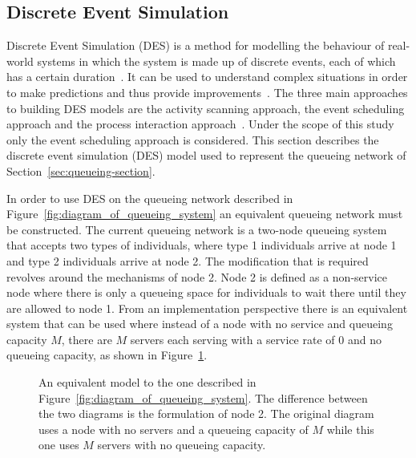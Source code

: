 \subsection{Discrete Event Simulation}\label{sec:discrete_event_simulation}

Discrete Event Simulation (DES) is a method for modelling the behaviour of
real-world systems in which the system is made up of discrete events, each of
which has a certain duration~\cite{DESstewart}.
It can be used to understand complex situations in order to make predictions
and thus provide improvements~\cite{VinceGeraintBook}.
The three main approaches to building DES models are the activity scanning
approach, the event scheduling approach and the process interaction
approach~\cite{DESapproaches}.
Under the scope of this study only the event scheduling approach is considered.
This section describes the discrete event simulation (DES) model used to
represent the queueing network of Section~\ref{sec:queueing-section}.

In order to use DES on the queueing network described in
Figure~\ref{fig:diagram_of_queueing_system} an equivalent queueing network must
be constructed.
The current queueing network is a two-node queueing system that accepts two
types of individuals, where type 1 individuals arrive at node 1 and
type 2 individuals arrive at node 2.
The modification that is required revolves around the mechanisms of node 2.
Node 2 is defined as a non-service node where there is only a queueing
space for individuals to wait there until they are allowed to node 1.
From an implementation perspective there is an equivalent system that can be
used where instead of a node with no service and queueing capacity \(M\), there
are \(M\) servers each serving with a service rate of \(0\) and no queueing
capacity, as shown in Figure~\ref{fig:equivalent_diagram_of_queueing_system}.

\begin{figure}[h]
    \centering
    
    \caption{An equivalent model to the one described in
    Figure~\ref{fig:diagram_of_queueing_system}. The difference between the two
    diagrams is the formulation of node 2. The original diagram uses
    a node with no servers and a queueing capacity of \(M\) while this one uses
    \(M\) servers with no queueing capacity.}
    \label{fig:equivalent_diagram_of_queueing_system}
\end{figure}
    

